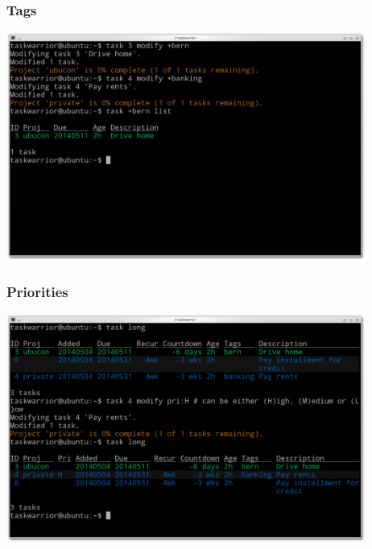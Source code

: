 \documentclass[t,handout]{beamer}
\begin{document}
\begin{frame}[fragile]\frametitle{Tags}
\begin{center} %
\includegraphics[width=11.8cm,height=7.5cm]{tags.png}
\end{center}
\end{frame}

\begin{frame}[fragile]\frametitle{Priorities}
\begin{center} %
\includegraphics[width=11.8cm,height=7.5cm]{priorities.png}
\end{center}
\end{frame}
\end{document}
